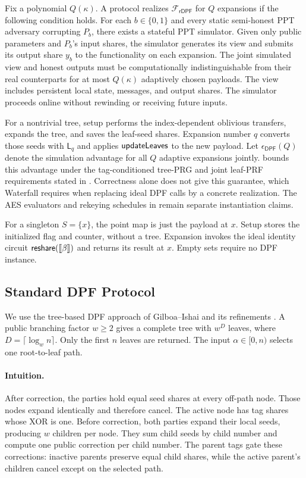 Fix a polynomial $Q(\kappa)$.  A protocol realizes
$\mathcal F_{\mathsf{rDPF}}$ for $Q$ expansions if the following condition
holds.  For each $b\in\{0,1\}$ and every static semi-honest PPT adversary
corrupting $P_b$, there exists a stateful PPT simulator.  Given only public
parameters and $P_b$'s input shares, the simulator generates its view and
submits its output share $y_b$ to the functionality on each expansion.
The joint simulated view and honest outputs must be computationally
indistinguishable from their real counterparts for at most $Q(\kappa)$
adaptively chosen payloads.  The view includes persistent local state,
messages, and output shares.  The simulator proceeds online without
rewinding or receiving future inputs.

For a nontrivial tree, setup performs the index-dependent oblivious
transfers, expands the tree, and saves the leaf-seed shares.
Expansion number $q$ converts those seeds with $\mathsf L_q$ and applies
$\textsf{updateLeaves}$ to the new payload. Let $\epsilon_{\mathsf{DPF}}(Q)$ denote
the simulation advantage for all $Q$ adaptive expansions jointly.
 bounds this advantage under
the tag-conditioned tree-PRG and joint leaf-PRF requirements stated in
. Correctness alone does not give
this guarantee, which Waterfall requires when replacing ideal DPF calls by
a concrete realization. The AES evaluators and rekeying schedules in
 remain separate instantiation claims.

For a singleton $S=\{x\}$, the point map is just the payload at $x$.
Setup stores the initialized flag and counter, without a tree.
Expansion invokes the ideal identity circuit $\mathsf{reshare}(\share\beta)$
and returns its result at $x$. Empty sets require no DPF instance.

\subsection{Standard DPF Protocol}
 

We use the tree-based DPF approach of Gilboa--Ishai \cite{dpf}
and its refinements \cite{dpf2,dpfKeygen}. A public branching factor $w\geq2$
gives a complete tree with $w^D$ leaves, where $D=\lceil\log_w n\rceil$.
Only the first $n$ leaves are returned. The input $\alpha\in[0,n)$ selects
one root-to-leaf path.

\paragraph{Intuition.}
After correction, the parties hold equal seed shares at every off-path node.
Those nodes expand identically and therefore cancel. The active node has
tag shares whose XOR is one. Before correction, both parties expand their
local seeds, producing $w$ children per node. They sum child seeds by child
number and compute one public correction per child number.
The parent tags gate these corrections: inactive parents preserve equal
child shares, while the active parent's children cancel except on the
selected path.

